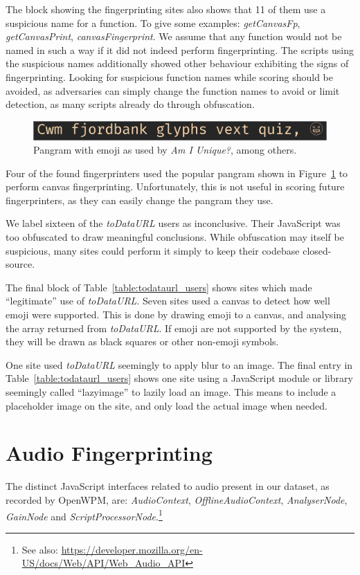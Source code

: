 \documentclass[
    fontsize=12pt,
    headings=small,
    parskip=half,
    bibliography=totoc,
    numbers=noenddot,
    open=any
    ]{scrreprt}
\begin{document}
The block showing the fingerprinting sites also shows that 11 of them
use a suspicious name for a function. To give some examples:
\textit{getCanvasFp}, \textit{getCanvasPrint}, \textit{canvasFingerprint}.
We assume that any function would not be named in such a way if it did not
indeed perform fingerprinting.
The scripts using the suspicious names additionally showed other behaviour
exhibiting the signs of fingerprinting.
Looking for suspicious function names while scoring should be avoided,
as adversaries can simply change the function names to avoid or
limit detection, as many scripts already do through obfuscation.

\begin{figure}
\centering
\includegraphics[scale=0.3]{images/fjordbank.png}
\caption{Pangram with emoji as used by \textit{Am I Unique?}, among others.}
\label{code:pangram}
\end{figure}

Four of the found fingerprinters used the popular pangram shown in
Figure~\ref{code:pangram} to perform canvas fingerprinting.
Unfortunately, this is not useful in scoring future fingerprinters,
as they can easily change the pangram they use.

We label sixteen of the \textit{toDataURL} users as inconclusive.
Their JavaScript was too obfuscated to draw meaningful conclusions.
While obfuscation may itself be suspicious, many sites could perform
it simply to keep their codebase closed-source.

The final block of Table~\ref{table:todataurl_users} shows sites which
made ``legitimate'' use of \textit{toDataURL}. Seven sites used a canvas
to detect how well emoji were supported. This is done by drawing emoji
to a canvas, and analysing the array returned from \textit{toDataURL}.
If emoji are not supported by the system, they will be drawn as black
squares or other non-emoji symbols.

One site used \textit{toDataURL} seemingly to apply blur to an image.
The final entry in Table~\ref{table:todataurl_users} shows one site
using a JavaScript module or library seemingly called ``lazyimage''
to lazily load an image. This means to include a placeholder
image on the site, and only load the actual image when needed.


\section{Audio Fingerprinting}
\label{sec:audio_fingerprinting}
The distinct JavaScript interfaces related to audio present in our dataset,
as recorded by OpenWPM, are:
\textit{AudioContext},
\textit{OfflineAudioContext},
\textit{AnalyserNode},
\textit{GainNode} and \textit{ScriptProcessorNode}.\footnote{See also: \url{https://developer.mozilla.org/en-US/docs/Web/API/Web_Audio_API}}
\end{document}
